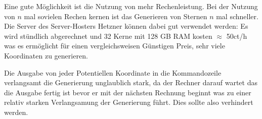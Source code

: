 Eine gute Möglichkeit ist die Nutzung von mehr Rechenleistung. Bei der Nutzung
von \( n \) mal sovielen Rechen kernen ist das Generieren von Sternen \( n \)
mal schneller. Die Server des Server-Hosters Hetzner können dabei gut
verwendet werden: Es wird stündlich abgerechnet und 32 Kerne mit 128 GB RAM
kosten \( \approx \) 50ct/h was es ermöglicht für einen vergleichsweisen
Günstigen Preis, sehr viele Koordinaten zu generieren.

Die Ausgabe von jeder Potentiellen Koordinate in die Kommandozeile verlangsamt
die Generierung unglaublich stark, da der Rechner darauf wartet das die Ausgabe
fertig ist bevor er mit der nächsten Rechnung beginnt was zu einer relativ
starken Verlangsamung der Generierung führt. Dies sollte also verhindert werden.
